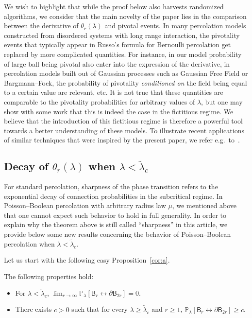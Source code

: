 \documentclass[AHL,Unicode,longabstracts]{cedram}
\begin{document}
We wish to highlight that while the proof below also harvests randomized \linebreak algorithms, we consider that the main novelty of the paper lies in the comparison between the derivative of $\theta_r(\lambda)$ and pivotal events. In many percolation models constructed from disordered systems with long range interaction, the pivotality events that typically appear in Russo's formula for Bernoulli percolation get replaced by more complicated quantities. For instance, in our model probability of large ball being pivotal also enter into the expression of the derivative, in percolation models built out of Gaussian processes such as Gaussian Free Field or Bargmann--Fock, the probability of pivotality \emph{conditioned on} the field being equal to a certain value are relevant, etc. It is not true that these quantities are comparable to the pivotality probabilities for arbitrary values of $\lambda$, but one may show with some work that this is indeed the case in the fictitious regime. We believe that the introduction of this fictitious regime is therefore a powerful tool towards a better understanding of these models. To illustrate recent applications of similar techniques that were inspired by the present paper, we refer e.g.~to~\cite{DGRS19,GRSY18}.


\subsection{Decay of $\theta_r(\lambda)$ when $\lambda<\widetilde\lambda_c$}
For standard percolation, sharpness of the phase transition refers to the exponential decay of connection probabilities in the subcritical regime. In Poisson--Boolean percolation with arbitrary radius law $\mu$, we mentioned above that one cannot expect such behavior to hold in full generality. In order to explain why the theorem above is still called ``sharpness'' in this article, we provide below some new results concerning the behavior of Poisson--Boolean percolation when $\lambda<\widetilde\lambda_c$.

Let us start with the following easy Proposition~\ref{cor:a}.


\pagebreak
\begin{prop}\label{cor:a}
The following properties hold:
\begin{itemize}%
\item For $\lambda<\widetilde\lambda_c$, $\displaystyle\lim_{r\rightarrow\infty}{\mathbb P}_\lambda[\mathsf B_r\longleftrightarrow\partial\mathsf B_{2r}]=0$.
\item There exists $c>0$ such that for every $\lambda\ge\widetilde\lambda_c$ and $r\ge1$, ${\mathbb P}_\lambda[\mathsf B_r\longleftrightarrow\partial\mathsf B_{2r}]\ge c$.
\end{itemize}
\end{prop}
\end{document}

